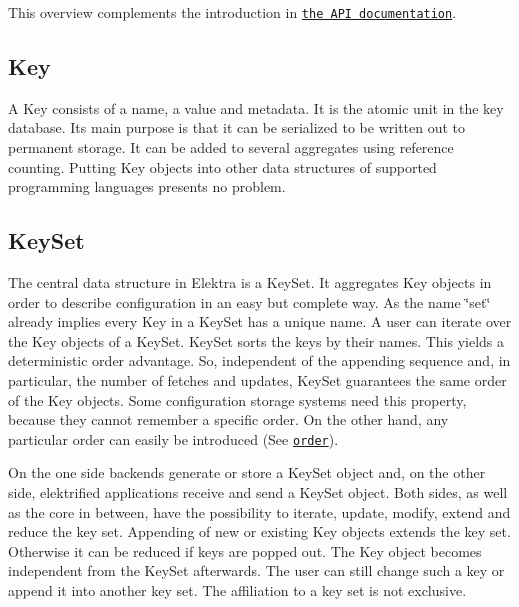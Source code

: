 This overview complements the introduction in \href{https://doc.libelektra.org/api/current/html/}{\tt the A\+PI documentation}.

\subsection*{Key}

A {\ttfamily Key} consists of a name, a value and metadata. It is the atomic unit in the key database. Its main purpose is that it can be serialized to be written out to permanent storage. It can be added to several aggregates using reference counting. Putting {\ttfamily Key} objects into other data structures of supported programming languages presents no problem.

\subsection*{Key\+Set}

The central data structure in Elektra is a {\ttfamily Key\+Set}. It aggregates {\ttfamily Key} objects in order to describe configuration in an easy but complete way. As the name \char`\"{}set\char`\"{} already implies every {\ttfamily Key} in a {\ttfamily Key\+Set} has a unique name. A user can iterate over the {\ttfamily Key} objects of a {\ttfamily Key\+Set}. {\ttfamily Key\+Set} sorts the keys by their names. This yields a deterministic order advantage. So, independent of the appending sequence and, in particular, the number of fetches and updates, {\ttfamily Key\+Set} guarantees the same order of the {\ttfamily Key} objects. Some configuration storage systems need this property, because they cannot remember a specific order. On the other hand, any particular order can easily be introduced (See \href{/home/markus/Projekte/Elektra/current/doc/METADATA.ini}{\tt order}).

On the one side backends generate or store a {\ttfamily Key\+Set} object and, on the other side, elektrified applications receive and send a {\ttfamily Key\+Set} object. Both sides, as well as the core in between, have the possibility to iterate, update, modify, extend and reduce the key set. Appending of new or existing {\ttfamily Key} objects extends the key set. Otherwise it can be reduced if keys are popped out. The {\ttfamily Key} object becomes independent from the {\ttfamily Key\+Set} afterwards. The user can still change such a key or append it into another key set. The affiliation to a key set is not exclusive.


